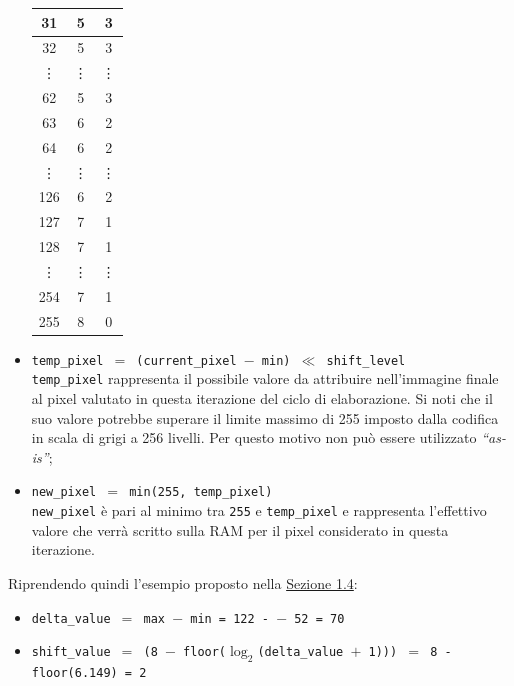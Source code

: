 \documentclass{article}
\begin{document}
\begin{itemize}
\begin{table}[h]
\begin{tabular}{||c|c|c||}
                    31      & 5         & 3         \\\hline
                    32      & 5         & 3         \\\hline
                    \vdots  & \vdots    & \vdots    \\\hline
                    62      & 5         & 3         \\\hline
                    63      & 6         & 2         \\\hline
                    64      & 6         & 2         \\\hline
                    \vdots  & \vdots    & \vdots    \\\hline
                    126     & 6         & 2         \\\hline
                    127     & 7         & 1         \\\hline
                    128     & 7         & 1         \\\hline
                    \vdots  & \vdots    & \vdots    \\\hline
                    254     & 7         & 1         \\\hline
                    255     & 8         & 0         \\\hline
                \end{tabular}
            \end{table}
            \vspace{0,3cm}

    \item   \texttt{temp\_pixel $=$ (current\_pixel $-$ min) $\ll$ shift\_level}\\
            \texttt{temp\_pixel} rappresenta il possibile valore da attribuire nell’immagine finale al pixel valutato in questa iterazione del ciclo di elaborazione. Si noti che il suo valore potrebbe superare il limite massimo di 255 imposto dalla codifica in scala di grigi a 256 livelli. Per questo motivo non può essere utilizzato \emph{“as-is”};
    \item   \texttt{new\_pixel $=$ min(255, temp\_pixel)}\\
            \texttt{new\_pixel} è pari al minimo tra \texttt{255} e \texttt{temp\_pixel} e rappresenta l’effettivo valore che verrà scritto sulla RAM per il pixel considerato in questa iterazione.
\end{itemize}

Riprendendo quindi l'esempio proposto nella \hyperref[sec:esempio]{Sezione 1.4}:
\begin{itemize}
    \item   \texttt{delta\_value $=$ max $-$ min = 122 - $-$ 52 = 70}
    \item   \texttt{shift\_value $=$ (8 $-$ floor($\log_{2} $(delta\_value $+$ 1))) $=$ 8 - floor(6.149) = 2}
\end{itemize}
\end{document}
